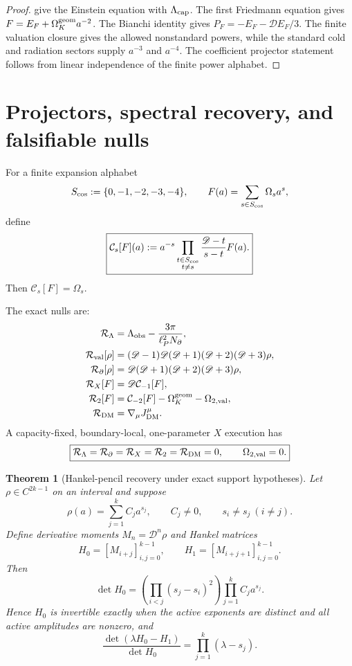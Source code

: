 \documentclass[aps,prd,reprint,nofootinbib,superscriptaddress,floatfix]{revtex4-2}
\numberwithin{equation}{section}
\theoremstyle{definition}
\theoremstyle{plain}
\newtheorem{theorem}{Theorem}[section]
\newcommand{\Dil}{\mathscr D}
\newcommand{\Ncap}{N_{\partial}}
\begin{document}
\begin{proof}
 give the Einstein equation with \(\Lambda_{\rm cap}\).  The first Friedmann equation gives \(F=E_F+\Omega_K^{\rm geom}a^{-2}\).  The Bianchi identity gives \(P_F=-E_F-\Dil E_F/3\).  The finite valuation closure gives the allowed nonstandard powers, while the standard cold and radiation sectors supply \(a^{-3}\) and \(a^{-4}\).  The coefficient projector statement follows from linear independence of the finite power alphabet.
\end{proof}

\section{Projectors, spectral recovery, and falsifiable nulls}

For a finite expansion alphabet
\[
S_{\rm cos}:=\{0,-1,-2,-3,-4\},
\qquad
F(a)=\sum_{s\in S_{\rm cos}}\Omega_s a^s,
\]
define
\begin{equation}
\boxed{
\mathcal C_s[F](a)
:=
a^{-s}
\prod_{\substack{t\in S_{\rm cos}\\t\ne s}}
\frac{\Dil-t}{s-t}F(a).
}
\end{equation}
Then \(\mathcal C_s[F]=\Omega_s\).

The exact nulls are:
\begin{align}
\mathcal R_\Lambda
&=
\Lambda_{\rm obs}
-
\frac{3\pi}{\ell_P^2\Ncap},
\\
\mathcal R_{\rm val}[\rho]
&=
(\Dil-1)\Dil(\Dil+1)(\Dil+2)(\Dil+3)\rho,
\\
\mathcal R_{\partial}[\rho]
&=
\Dil(\Dil+1)(\Dil+2)(\Dil+3)\rho,
\\
\mathcal R_X[F]
&=
\Dil\mathcal C_{-1}[F],
\\
\mathcal R_{2}[F]
&=
\mathcal C_{-2}[F]-\Omega_K^{\rm geom}-\Omega_{2,\rm val},
\\
\mathcal R_{\rm DM}
&=
\nabla_\mu J^\mu_{\rm DM}.
\end{align}
A capacity-fixed, boundary-local, one-parameter \(X\) execution has
\begin{equation}
\boxed{
\mathcal R_\Lambda=\mathcal R_{\partial}=\mathcal R_X=\mathcal R_2=\mathcal R_{\rm DM}=0,
\qquad
\Omega_{2,\rm val}=0.
}
\end{equation}

\begin{theorem}[Hankel-pencil recovery under exact support hypotheses]\label{thm:hankel-hyp}
Let \(\rho\in C^{2k-1}\) on an interval and suppose
\[
\rho(a)=\sum_{j=1}^k C_j a^{s_j},
\qquad
C_j\ne0,\qquad
s_i\ne s_j\ (i\ne j).
\]
Define derivative moments \(M_n=\Dil^n\rho\) and Hankel matrices
\[
H_0=[M_{i+j}]_{i,j=0}^{k-1},
\qquad
H_1=[M_{i+j+1}]_{i,j=0}^{k-1}.
\]
Then
\[
\det H_0=
\left(\prod_{i<j}(s_j-s_i)^2\right)
\prod_{j=1}^k C_ja^{s_j}.
\]
Hence \(H_0\) is invertible exactly when the active exponents are distinct and all active amplitudes are nonzero, and
\begin{equation}
\boxed{
\frac{\det(\lambda H_0-H_1)}{\det H_0}
=
\prod_{j=1}^k(\lambda-s_j).
}
\end{equation}
\end{theorem}
\end{document}

